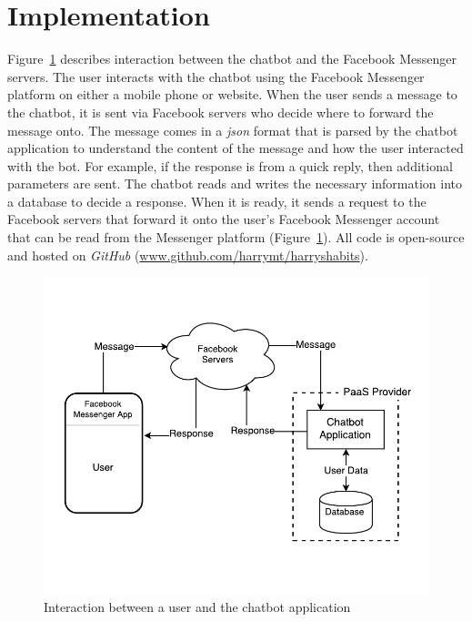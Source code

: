 
\section{Implementation}

Figure~\ref{fig:prototype_component_overview} describes interaction between the chatbot and the Facebook Messenger servers. The user interacts with the chatbot using the Facebook Messenger platform on either a mobile phone or website. When the user sends a message to the chatbot, it is sent via Facebook servers who decide where to forward the message onto. The message comes in a \textit{json} format that is parsed by the chatbot application to understand the content of the message and how the user interacted with the bot. For example, if the response is from a quick reply, then additional parameters are sent. The chatbot reads and writes the necessary information into a database to decide a response. When it is ready, it sends a request to the Facebook servers that forward it onto the user's Facebook Messenger account that can be read from the Messenger platform (Figure~\ref{fig:prototype_component_overview}). All code is open-source and hosted on \textit{GitHub} (\url{www.github.com/harrymt/harryshabits}).

\begin{figure}[H]
    \centering
    \includegraphics[width=5.1in]{../resources/diagrams/chatbot-component-overview.pdf}
    \caption{Interaction between a user and the chatbot application}
    \label{fig:prototype_component_overview}
\end{figure}

